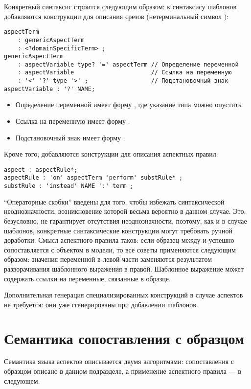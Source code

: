 Конкретный синтаксис строится следующим образом: к синтаксису шаблонов добавляются конструкции для описания срезов (нетерминальный символ ):
\begin{lstlisting}[language=Grammatic]
aspectTerm 
	: genericAspectTerm
	: <?domainSpecificTerm> ;
genericAspectTerm
	: aspectVariable type? '=' aspectTerm // Определение переменной
	: aspectVariable                      // Ссылка на переменную
	: '<' '?' type '>' ;                  // Подстановочный знак
aspectVariable : '?' NAME;
\end{lstlisting}
\begin{itemize}
\item Определение переменной имеет форму , где указание типа можно опустить.
\item Ссылка на переменную имеет форму .
\item Подстановочный знак имеет форму .
\end{itemize}
Кроме того, добавляются конструкции для описания аспектных правил:
\begin{lstlisting}
aspect : aspectRule*;
aspectRule : 'on' aspectTerm 'perform' substRule* ;
substRule : 'instead' NAME ':' term ;
\end{lstlisting}
``Операторные скобки''  введены для того, чтобы избежать синтаксической неоднозначности, возникновение которой весьма вероятно в данном случае. Это, безусловно, не гарантирует отсутствия неоднозначности, поэтому, как и в случае шаблонов, конкретные синтаксические конструкции могут требовать ручной доработки. Смысл аспектного правила таков: если образец между  и  успешно сопоставляется с объектом в модели, то все советы  применяются следующим образом: значения переменной в левой части заменяются результатом разворачивания шаблонного выражения в правой. Шаблонное выражение может содержать ссылки на переменные, связанные в образце.

Дополнительная генерация специализированных конструкций в случае аспектов не требуется: они уже сгенерированы при добавлении шаблонов.

\section{Семантика сопоставления с образцом}

Семантика языка аспектов описывается двумя алгоритмами: сопоставления с образцом описано в данном подразделе, а применение аспектного правила --- в следующем.

